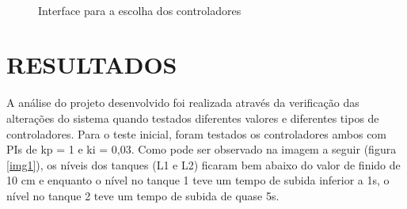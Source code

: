 \documentclass[a4paper,12pt]{article}
\begin{document}
\begin{figure}[H]
     \centering
     \hspace{4ex}
     \\
     \caption{Interface para a escolha dos controladores}
     \label{fig:controladores}
\end{figure}


\newpage


\thispagestyle{main}

\section{RESULTADOS}

\hspace{4ex}A análise do projeto desenvolvido foi realizada através da verificação das alterações do sistema quando testados diferentes valores e diferentes tipos de controladores.
Para o teste inicial, foram testados os controladores ambos com PIs de kp = 1 e ki = 0,03. Como pode ser observado na imagem a seguir (figura \ref{img1}), os níveis dos tanques (L1 e L2) ficaram bem abaixo do valor de finido de 10 cm e enquanto o nível no tanque 1 teve um tempo de subida inferior a 1s, o nível no tanque 2 teve um tempo de subida de quase 5s.
\end{document}
